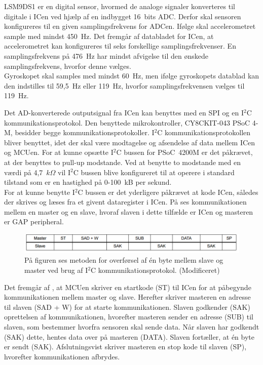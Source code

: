LSM9DS1 er en digital sensor, hvormed de analoge signaler konverteres til digitale i ICen ved hjælp af en indbygget 16~bits ADC. Derfor skal sensoren konfigureres til en given samplingsfrekvens for ADCen. Ifølge  skal accelerometret sample med mindst 450~Hz. Det fremgår af databladet for ICen, at accelerometret kan konfigureres til seks forskellige samplingsfrekvenser. En samplingsfrekvens på 476~Hz har mindst afvigelse til den ønskede samplingsfrekvens, hvorfor denne vælges. \\
Gyroskopet skal samples med mindst 60~Hz, men ifølge gyroskopets datablad kan den indstilles til 59,5~Hz eller 119~Hz, hvorfor samplingsfrekvensen vælges til 119~Hz.

Det AD-konverterede outputsignal fra ICen kan benyttes med en SPI og en I$^{2}$C kommunikationsprotokol. Den benyttede mikrokontroller, CY8CKIT-043 PSoC 4-M, besidder begge kommunikationsprotokoller. I$^{2}$C kommunikationsprotokollen bliver benyttet, idet der skal være modtagelse og afsendelse af data mellem ICen og MCUen. For at kunne opsætte I$^{2}$C bussen for PSoC~4200M er det påkrævet, at der benyttes to pull-up modstande. Ved at benytte to modstande med en værdi på 4,7~$k\Omega$ vil I$^{2}$C bussen blive konfigureret til at operere i standard tilstand som er en hastighed på 0-100~kB per sekund. \citep{CYPRESS2016} \\
For at kunne benytte I$^{2}$C bussen er det yderligere påkrævet at kode ICen, således der skrives og læses fra et givent dataregister i ICen. På  ses kommunikationen mellem en master og en slave, hvoraf slaven i dette tilfælde er ICen og masteren er GAP peripheral. 
\begin{figure}[H]
	\centering
	\includegraphics[scale=0.75]{figures/cDesign/Sensor_write_read2.png}
	\caption{På figuren ses metoden for overførsel af én byte mellem slave og master ved brug af I$^{2}$C kommunikationsprotokol. \citep{STMicroelectronics2016} (Modificeret)}
	\label{Fig:master_slave}
\end{figure}\vspace{-0.25cm}
Det fremgår af , at MCUen skriver en startkode (ST) til ICen for at påbegynde kommunikationen mellem master og slave. Herefter skriver masteren en adresse til slaven (SAD + W) for at starte kommunikationen. Slaven godkender (SAK) oprettelsen af kommunikationen, hvorefter masteren sender en adresse (SUB) til slaven, som bestemmer hvorfra sensoren skal sende data. Når slaven har godkendt (SAK) dette, hentes data over på masteren (DATA). Slaven fortæller, at én byte er sendt (SAK). Afslutningsvist skriver masteren en stop kode til slaven (SP), hvorefter kommunikationen afbrydes.

